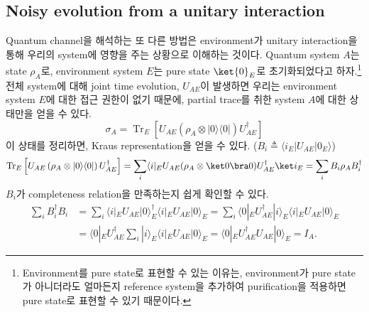 \subsection{Noisy evolution from a unitary interaction}
Quantum channel을 해석하는 또 다른 방법은 environment가 unitary interaction을 통해 우리의 system에 영향을 주는 상황으로 이해하는 것이다. Quantum system $A$는 state $\rho_A$로, environment system $E$는 pure state $\ket{0}_E$로 초기화되었다고 하자.\footnote{Environment를 pure state로 표현할 수 있는 이유는, environment가 pure state가 아니더라도 얼마든지 reference system을 추가하여 purification을 적용하면 pure state로 표현할 수 있기 때문이다.} 
전체 system에 대해 joint time evolution, $U_{AE}$이 발생하면 우리는 environment system $E$에 대한 접근 권한이 없기 때문에, partial trace를 취한 system $A$에 대한 상태만을 얻을 수 있다. 
\begin{equation*}
    \sigma_A=\operatorname{Tr}_E\left[U_{A E}\left(\rho_A \otimes|0\rangle\langle 0|\right) U_{A E}^{\dagger}\right]
\end{equation*}
이 상태를 정리하면, Kraus representation을 얻을 수 있다. ($B_i \triangleq \langle i_E | U_{AE} | 0_E \rangle$)
\begin{equation*}
    \operatorname{Tr}_E\left[U_{A E}\left(\rho_A \otimes|0\rangle\langle 0|\right) U_{A E}^{\dagger}\right] = \sum_i \langle i|_E U_{AE} (\rho_A \otimes \ket 0 \bra 0) U^{\dagger}_{AE} \ket i_{E} = \sum_i B_i \rho_A B_i^\dagger
\end{equation*}
$B_i$가 completeness relation을 만족하는지 쉽게 확인할 수 있다.
\begin{align*}
    \sum_i B_i^{\dagger} B_i &= \sum_i\langle i|_E U_{A E} | 0\rangle_E^{\dagger}\langle i|_E U_{A E} | 0\rangle_E = \sum_i\langle 0|_E U_{A E}^{\dagger} | i\rangle_E\langle i|_E U_{A E} | 0\rangle_E 
    \\ &= \langle 0|_E U_{A E}^{\dagger} \sum_i | i\rangle_E\langle i|_E U_{A E} | 0\rangle_E =\langle 0|_E U_{A E}^{\dagger} U_{A E} | 0\rangle_E = I_A .
\end{align*}

